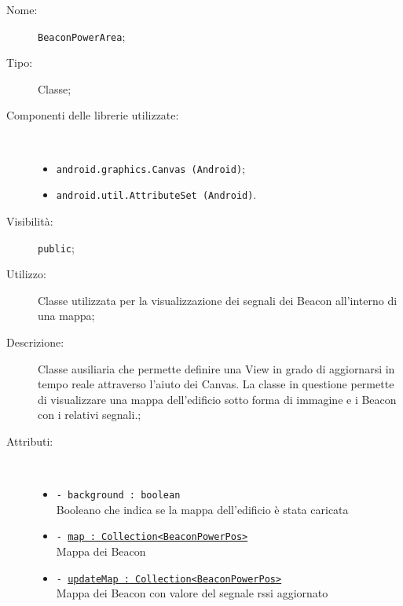 \documentclass[../DefinizioneDiProdotto.tex]{subfiles}
\begin{document}
\begin{description}
	\item[Nome:] \texttt{BeaconPowerArea};
	\item[Tipo:] Classe;
	\item[Componenti delle librerie utilizzate:] \
	\begin{itemize}
		\item \texttt{android.graphics.Canvas (Android)};
		
		\item \texttt{android.util.AttributeSet (Android)}.
		
	\end{itemize}
	\item[Visibilità:] \texttt{public};
	\item[Utilizzo:] Classe utilizzata per la visualizzazione dei segnali dei Beacon all'interno di una mappa;
	\item[Descrizione:] Classe ausiliaria che permette definire una View in grado di aggiornarsi in tempo reale attraverso
	l'aiuto dei Canvas. La classe in questione permette di visualizzare una mappa dell'edificio sotto forma di immagine e i Beacon con i relativi segnali.;
	\item[Attributi:] \
	\begin{itemize}
		\item \texttt{- background : boolean}\\
		Booleano che indica se la mappa dell'edificio è stata caricata
		
		\item \texttt{- \underline{map : Collection<BeaconPowerPos>}}\\
		Mappa dei Beacon
		
		\item \texttt{- \underline{updateMap : Collection<BeaconPowerPos>}}\\
		Mappa dei Beacon con valore del segnale rssi aggiornato
		

\end{itemize}
\end{description}
\end{document}
